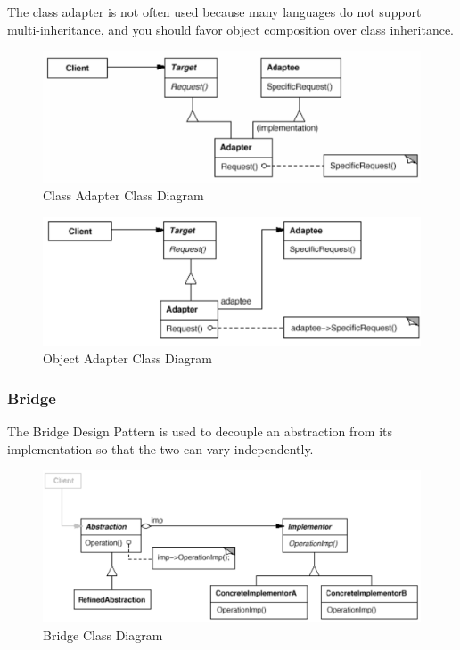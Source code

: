 \documentclass[11pt]{article}
\begin{document}
The class adapter is not often used because many languages do not support multi-inheritance, and you should favor object composition over class inheritance.

\begin{figure}[htbp]
\centering
\includegraphics[width=.9\linewidth]{img/class_adapter.png}
\caption{\label{fig:class-adapter-class-diagram}Class Adapter Class Diagram}
\end{figure}

\begin{figure}[htbp]
\centering
\includegraphics[width=.9\linewidth]{img/object_adapter.png}
\caption{\label{fig:object-adapter-class-diagram}Object Adapter Class Diagram}
\end{figure}
\subsubsection{Bridge}
\label{sec:org4ac4b61}
The Bridge Design Pattern is used to decouple an abstraction from its implementation so that the two can vary independently.

\begin{figure}[htbp]
\centering
\includegraphics[width=.9\linewidth]{img/bridge.png}
\caption{\label{fig:bridge-class-diagram}Bridge Class Diagram}
\end{figure}
\end{document}
